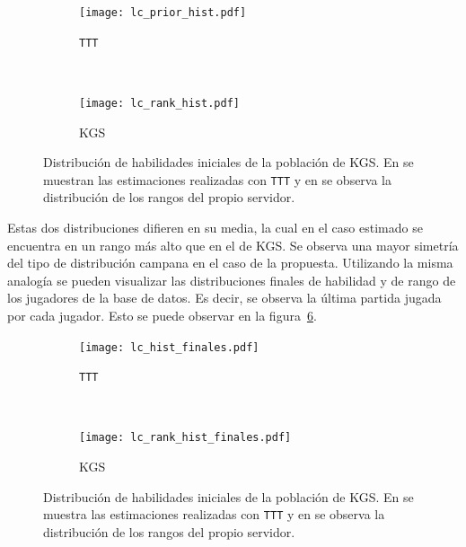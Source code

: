 \documentclass[11pt,twoside,spanish]{report} %
\begin{document}
\begin{figure}[H]
	\centering
	\begin{subfigure}[t]{.49\textwidth}
		\centering
		\texttt{[image: lc\_prior\_hist.pdf]}
		\caption{\texttt{TTT}}
		\label{fig:hist_a}
	\end{subfigure}
	~
	\begin{subfigure}[t]{.49\textwidth}
		\centering
		\texttt{[image: lc\_rank\_hist.pdf]}
		\caption{KGS}
		\label{fig:hist_b}
	\end{subfigure}
	\caption{Distribuci\'on de habilidades iniciales de la poblaci\'on de KGS. En  se muestran las estimaciones realizadas con \texttt{TTT} y en   se observa la distribuci\'on de los rangos del propio servidor.}
	\label{fig:hist_rank}
\end{figure}

Estas dos distribuciones difieren en su media, la cual en el caso estimado se encuentra en un rango m\'as alto que en el de KGS.
Se observa una mayor simetr\'ia del tipo de distribuci\'on campana en el caso de la propuesta.
Utilizando la misma analog\'ia se pueden visualizar las distribuciones finales de habilidad y de rango de los jugadores de la base de datos.
Es decir, se observa la \'ultima partida jugada por cada jugador.
Esto se puede observar en la figura~\ref{fig:hist_rank_fin}.

\begin{figure}[H]
	\centering
	\begin{subfigure}[t]{.49\textwidth}
		\centering
		\texttt{[image: lc\_hist\_finales.pdf]}
		\caption{\texttt{TTT}}
		\label{fig:hist_fin_a}
	\end{subfigure}
	~
	\begin{subfigure}[t]{.49\textwidth}
		\centering
		\texttt{[image: lc\_rank\_hist\_finales.pdf]}
		\caption{KGS}
		\label{fig:hist_fin_b}
	\end{subfigure}
	\caption{Distribuci\'on de habilidades iniciales de la poblaci\'on de KGS. En  se muestra las estimaciones realizadas con \texttt{TTT} y en  se observa la distribuci\'on de los rangos del propio servidor.}
	\label{fig:hist_rank_fin}
\end{figure}
\end{document}
